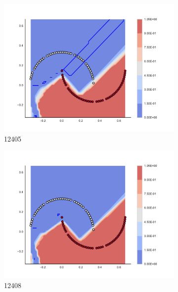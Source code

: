 \begin{figure}[h]
\begin{subfigure}[b]{0.09\textwidth}
    \includegraphics[clip, trim=2.35cm 1.75cm 4.5cm 0cm,width=\textwidth]{img/convergence/12405.pdf}
    \caption{12405}
    \label{fig:convergence_12405}
\end{subfigure}
%
\begin{subfigure}[b]{0.09\textwidth}
    \includegraphics[clip, trim=2.35cm 1.75cm 4.5cm 0cm,width=\textwidth]{img/convergence/12408.pdf}
    \caption{12408}
    \label{fig:convergence_12408}
\end{subfigure}
%
\begin{subfigure}[b]{0.09\textwidth}

\end{subfigure}
\end{figure}

